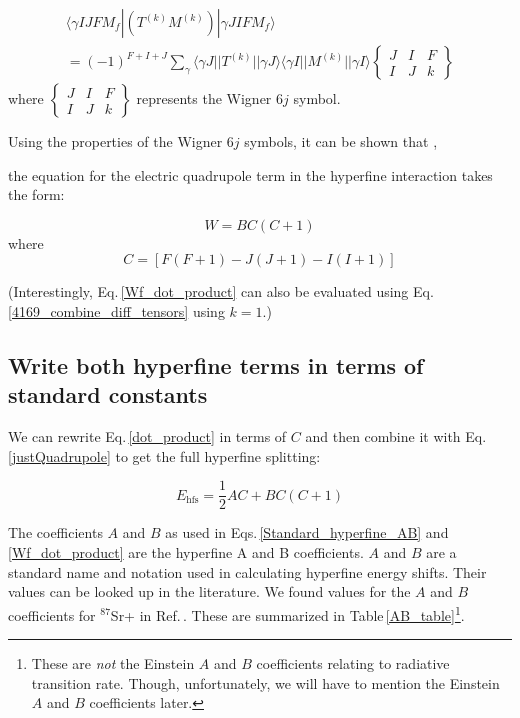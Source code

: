 \begin{multline}\label{4169_combine_diff_tensors}
\langle\gamma I J F M_f|(T^{(k)}M^{(k)})|\gamma J I F M_f\rangle \\
=
(-1)^{F+I+J} \sum_{\gamma} \langle\gamma J||T^{(k)}||\gamma J\rangle
\langle\gamma I || M^{(k)} ||\gamma I\rangle
\begin{Bmatrix}
J & I & F \\
I & J & k
\end{Bmatrix}
\end{multline}
where 
$\begin{Bmatrix}
J & I & F \\
I & J & k
\end{Bmatrix}$ represents the Wigner $6j$ symbol. 

Using the properties of the Wigner $6j$ symbols, it can be shown that \cite{cuaMITnotes}\cite{sobelman_spectra}, 

the equation for the electric quadrupole term in the hyperfine interaction takes the form:

\begin{equation}\label{justQuadrupole}
W=BC(C+1)
\end{equation}
where 
\begin{equation}
C=[F(F+1)-J(J+1)-I(I+1)]
\end{equation}

(Interestingly, Eq.\,\ref{Wf_dot_product} can also be evaluated using Eq.\,\ref{4169_combine_diff_tensors} using $k=1$.)

\subsection{Write both hyperfine terms in terms of standard constants}
We can rewrite Eq.\,\ref{dot_product} in terms of $C$ 
and then combine it with Eq.\,\ref{justQuadrupole} to get the full hyperfine splitting\cite{cuaMITnotes}: 

\begin{equation}\label{Standard_hyperfine_AB}
E_{\mathrm{hfs}}=\frac{1}{2}AC+BC(C+1)
\end{equation}

The coefficients $A$ and $B$ as used in Eqs.\,\ref{Standard_hyperfine_AB} and \ref{Wf_dot_product} are the hyperfine A and B coefficients. $A$ and $B$ are a standard name and notation used in calculating hyperfine energy shifts. Their values can be looked up in the literature\cite{cuaMITnotes}.  We found values for the $A$ and $B$ coefficients for $^{87}$Sr+ in Ref.\,\cite{safronova2photon}. These are summarized in Table\,\ref{AB_table}\footnote{These are \emph{not} the Einstein $A$ and $B$ coefficients relating to radiative transition rate. Though, unfortunately, we will have to mention the Einstein $A$ and $B$ coefficients later.}.  

